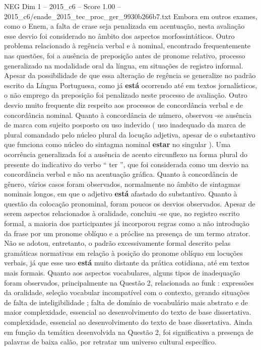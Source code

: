 \begin{textsample}{NEG Dim 1 – 2015\_c6 – Score 1.00 – 2015\_c6/enade\_2015\_tec\_proc\_ger\_9930b266b7.txt}
Embora em outros exames, como o Enem, a falta de crase seja penalizada em acentuação, nesta avaliação esse desvio foi considerado no âmbito dos aspectos morfossintáticos.
Outro problema relacionado à regência verbal e à nominal, encontrado frequentemente nas questões, foi a ausência de preposição antes de pronome relativo, processo generalizado na modalidade oral da língua, em situações de registro informal.
Apesar da possibilidade de que essa alteração de regência se generalize no padrão escrito da Língua Portuguesa, como já \textbf{está} ocorrendo até em textos jornalísticos, o não emprego da preposição foi penalizado neste processo de avaliação.
Outro desvio muito frequente diz respeito aos processos de concordância verbal e de concordância nominal.
Quanto à concordância de número, observou -se ausência de marca com sujeito posposto ou uso indevido ( uso inadequado da marca de plural comandado pelo núcleo plural da locução adjetiva, apesar de o substantivo que funciona como núcleo do sintagma nominal \textbf{estar} no singular ).
Uma ocorrência generalizada foi a ausência de acento circunflexo na forma plural do presente do indicativo do verbo “ ter ”, que foi considerada como um desvio na concordância verbal e não na acentuação gráfica.
Quanto à concordância de gênero, vários casos foram observados, normalmente no âmbito de sintagmas nominais longos, em que o adjetivo \textbf{está} afastado do substantivo.
Quanto à questão da colocação pronominal, foram poucos os desvios observados.
Apesar de serem aspectos relacionados à oralidade, concluiu -se que, no registro escrito formal, a maioria dos participantes já incorporou regras como a não introdução da frase por um pronome oblíquo e a próclise na presença de um termo atrator.
Não se adotou, entretanto, o padrão excessivamente formal descrito pelas gramáticas normativas em relação à posição do pronome oblíquo em locuções verbais, já que esse uso \textbf{está} muito distante da prática cotidiana, até em textos mais formais.
Quanto aos aspectos vocabulares, alguns tipos de inadequação foram observados, principalmente na Questão 2, relacionada ao funk : expressões da oralidade, seleção vocabular incompatível com o contexto, gerando situações de falta de inteligibilidade ; falta de domínio de vocabulário mais abstrato e de maior complexidade, essencial ao desenvolvimento do texto de base dissertativa. complexidade, essencial ao desenvolvimento do texto de base dissertativa.
Ainda em função da temática desenvolvida na Questão 2, foi significativa a presença de palavras de baixa calão, por retratar um universo cultural específico.

\end{textsample}
